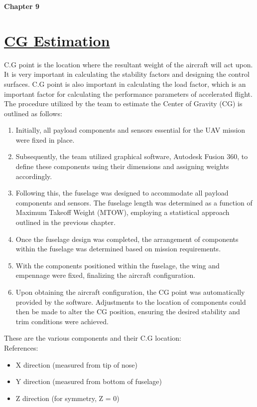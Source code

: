 \documentclass[12 pt]{article}
\begin{document}
{{\clearpage


\newpage
\newpage

\textbf{\Huge{Chapter 9}}
\section{\underline{CG Estimation}}

C.G point is the location where the resultant weight of the aircraft will act upon. It is very important in calculating the stability factors and designing the control surfaces. C.G point is also important in calculating the load factor, which is an important factor for calculating the performance parameters of accelerated flight.\\

The procedure utilized by the team to estimate the Center of Gravity (CG) is outlined as follows:

\begin{enumerate}
    \item Initially, all payload components and sensors essential for the UAV mission were fixed in place.
    \item Subsequently, the team utilized graphical software, Autodesk Fusion 360, to define these components using their dimensions and assigning weights accordingly.
    \item Following this, the fuselage was designed to accommodate all payload components and sensors. The fuselage length was determined as a function of Maximum Takeoff Weight (MTOW), employing a statistical approach outlined in the previous chapter.
    \item Once the fuselage design was completed, the arrangement of components within the fuselage was determined based on mission requirements.
    \item With the components positioned within the fuselage, the wing and empennage were fixed, finalizing the aircraft configuration.
    \item Upon obtaining the aircraft configuration, the CG point was automatically provided by the software. Adjustments to the location of components could then be made to alter the CG position, ensuring the desired stability and trim conditions were achieved.
\end{enumerate}

These are the various components and their C.G location:\\

 References:
   \begin{itemize}
       \item X direction (measured from tip of nose)
       \item Y direction (measured from bottom of fuselage)
       \item Z direction (for symmetry, Z = 0)


\end{itemize}}}
\end{document}
